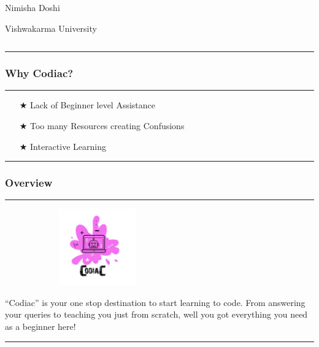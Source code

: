 \documentclass[14pt]{beamer}
\begin{document}
\begin{frame}
\begin{columns}
\begin{column}{0.2\textwidth}
\begin{figure}[htbp]
            \end{figure}
             \begin{spacing}{0.5}
              \centerline {\tiny Nimisha Doshi}
               \centerline {\tiny Vishwakarma University}
              \end{spacing}
        \end{column}
    \end{columns}
    \noindent
    {\color{pink} \rule{\linewidth}{0.7mm}}
\end{frame}



\begin{frame}
    \frametitle{Why Codiac?}
    \noindent
    {\color{pink} \rule{\linewidth}{0.7mm} }
    \begin{itemize}
    \item [$\bigstar$] Lack of Beginner level Assistance \\
    \item [$\bigstar$] Too many Resources creating Confusions \\  
   \item [$\bigstar$] Interactive Learning \\
    \end{itemize}
    \noindent
     {\color{pink} \rule{\linewidth}{0.7mm}}
\end{frame}


\begin{frame}
\frametitle{Overview}
\noindent
{\color{pink} \rule{\linewidth}{0.7mm} }
     \begin{figure}[htbp]
      \centerline{\includegraphics[width=2.3in, height=1.3in]{./Codiac/logos/logo.jpeg}}
     \end{figure}
\small ``Codiac'' is your one stop destination to start learning to code. From answering your queries to teaching you just from scratch, well you got everything you need as a beginner here!
\noindent
{\color{pink} \rule{\linewidth}{0.7mm} } 
\end{frame}   
\end{document}
